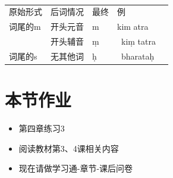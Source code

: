 \documentclass[17pt]{beamer}
\newcommand{\skt}[1]{{\sanskritfont{#1}}} %
\newcommand{\fullpada}[1]{\textcolor{OliveGreen}{#1}}
\newcommand{\sktpada}[1]{{\textcolor{OliveGreen}{\skt{#1}}}}
\newcommand{\skttranspada}[1]{{\sktpada{#1}~\fullpada{#1}}}
\begin{document}
\begin{frame}{\insertsection  ~~\insertsubsection }
  \small
  \centering
  \begin{tabular}{@{}lllll@{}} %
    原始形式 & 后词情况 & 最终 & 例 \\[0.2cm]
    词尾的m & 开头元音 & m & \sktpada{kimatra} \fullpada{kim atra}  \\
      &  开头辅音 & ṃ & \skttranspada{kiṃ tatra} \\[0.2cm]
        词尾的s & 无其他词 & ḥ & \skttranspada{bharataḥ}  \\
  \end{tabular} 
\end{frame}


\section{本节作业}

\begin{frame}{\insertsection }
  \begin{itemize}
    \item
      第四章练习3
    \item
      阅读教材第3、4课相关内容
    \bigskip
    \item
      现在请做学习通\nobreakdash-章节\nobreakdash-课后问卷
  \end{itemize}
\end{frame}  
\end{document}
